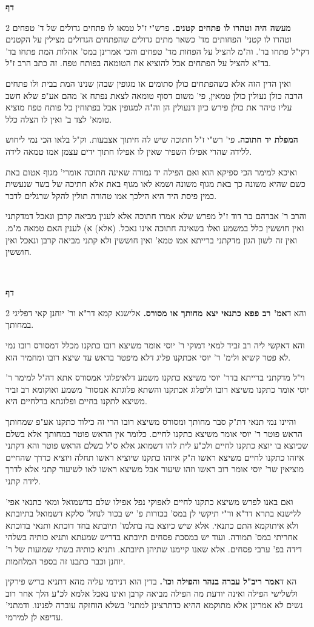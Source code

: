 \documentclass[12pt, openany]{book}
\newcommand{\sethebfont}{
\fontsize{10.5pt}{21.0pt} \selectfont
}
\newcommand{\twocol}[1]{
	{\sethebfont \begin{multicols}{2}
			#1
	\end{multicols}}	
}
\newcommand{\textblock}[1]{
{\sethebfont #1\\}	
}
\newcommand{\chapname}{}
\newcommand{\newchap}[1]{
	\addcontentsline{toc}{chapter}{#1}
	\renewcommand{\chapname}{#1}
		\begin{center}
			\textbf{%
\fontsize{16pt}{16pt}\selectfont
				#1}
		\end{center}
}
\begin{document}
\newchap{דף }
\twocol{\textbf{מעשה היה וטהרו לו פתחים קטנים.}  פרש"י ז"ל טמאו לו פתחים גדולים של ד' טפחים וטהרו לו קטני' הפחותים מד' כשאר מתים גדולים שהפתחים הגדולים מצילין על הקטנים דקי"ל פתחו בד'. וה"מ להציל על הפחות מד' טפחים והכי אמרינן במס' אהלות המת פתחו בד' בד"א להציל על הפתחים אבל להוציא את הטומאה בפותח טפח. זה כתב הרב ז"ל.\par  ואין הדין הזה אלא כשהפתחים כולן סתומים או מגופין שבהן שנינו המת בבית ולו פתחים הרבה כולן נעולין כולן טמאין, פי' משום דסוף טומאה לצאת נפתח א' מהם אע"פ שלא חשב עליו טיהר את כולן פירש כיון דנעולין הן וה"ה למגופין אבל בפתוחין כל פותח טפח מוציא טומא' לצד ב' ואין לו הצלה כלל. 
\par\textbf{המפלת יד חתוכה.}  פי' רש"י ז"ל חתוכה שיש לה חיתוך אצבעות. וק"ל בלאו הכי נמי ליחוש ללידה שהרי אפילו השפיר שאין לו אפילו חתוך ידים עצמן אמו טמאה לידה.\par  ואיכא למימר הכי ספיקא הוא ואם הפילה יד גמורה שאינה חתוכה אומרי' מגוף אטום באת כשם שהיא משונה כך באת מגוף משונה ושמא לאו מגוף באת אלא חתיכה של בשר שנעשית כמין פיסת היד היא הילכך אמו טהורה תולין להקל שרגלים לדבר.\par והרב ר' אברהם בר דוד ז"ל מפרש שלא אמרו חתוכה אלא לענין מביאה קרבן ונאכל דמדקתני ואין חוששין כלל במשמע ואלו בשאינה חתוכה אינו נאכל. (אלא) א) לענין האם טמאה מ"מ. ואין זה לשון הגון מדקתני ברייתא אמו טמא' ואין חוששין ולא קתני מביאה קרבן ונאכל ואין חוששין. 
\par}
\textblock{}{}
\newchap{דף }
\twocol{והא ד\textbf{אמ' רב פפא כתנאי יצא מחותך או מסורס.}  אלישנא קמא דר"א ור' יוחנן קאי דפליגי במחותך.\par  והא דאקשי ליה רב זביד למאי דמוקי ר' יוסי אומר משיצא רובו כתקנו מכלל דמסורס רובו נמי לא פטר קשיא ולימ' ר' יוסי אכתקנו פליג דלא מיפטר בראש עד שיצא רובו ומחמיר הוא.\par  וי"ל מדקתני ברייתא בדר' יוסי משיצא כתקנו משמע דלאיפלוגי אמסורס אתא דה"ל למימר ר' יוסי אומר כתקנו משיצא רובו וליפלוג אכתקנו והשתא פלוגתא אמסור' משמע ואוקומא רב זביד משיצא לתקנו בחיים ופלוגתא בדלחיים היא.\par והיינו נמי תנאי דת"ק סבר מחותך ומסורס משיצא רובו הרי זה כילוד כתקנו אע"פ שמחותך הראש פוטר ר' יוסי אומר משיצא כתקנו לחיים. כלומר אין הראש פוטר במחותך אלא בשלם שכיוצא בו יוצא כתקנו לחיים ולכ"ע לית להו דשמואג אלא ס"ל בשלם הראש פוטר והא דקתני איזהו כתקנו לחיים משיצא ראשו ה"ק איזהו כתקנו שיוציא ראשו תחלה ויוציא כדרך שהחיים מוציאין שר' יוסי אומר רוב ראשו וזהו שיעור אבל משיצא ראשו לאו לשיעור קתני אלא לדרך לידה קתני.\par  ואם באנו לפרש משיצא כתקנו לחיים לאפוקי נפל אפילו שלם כדשמואל ומאי כתנאי אפי' ללישנא בתרא דר"א ור"י תיקשי לן במס' בכורות פ' יש בכור לנחל' סלקא דשמואל בתיובתא ולא איתוקמא התם כתנאי. אלא שיש כיוצא בה בתלמו' תיובתא בחד דוכתא ותנאי בדוכתא אחריתי במס' תמורה. ועוד יש במסכת פסחים תיובתא בדריש שמעתא ותניא כותיה בשלהי דידה בפ' ערבי פסחים. אלא שאנו קיימנו שתיהן תיובתא. ותניא כותיה בשתי שמועות של ר' יוחנן וכבר כתבנו זה בספר המלחמות. 
\par הא ד\textbf{אמר ריב"ל עברה בנהר והפילה וכו'.}  בדין הוא דנירמי עליה מהא דתניא בריש פירקין ולשלישי הפילה ואינה יודעת מה הפילה מביאה קרבן ואינו נאכל אלמא לכ"ע הלך אחר רוב נשים לא אמרינן אלא מתוקמא ההיא כדתרצינן למתני' בשלא הוחזקה עוברה לפנינו. ודמתני' עדיפא לן למירמי. 
\par}
\end{document}
